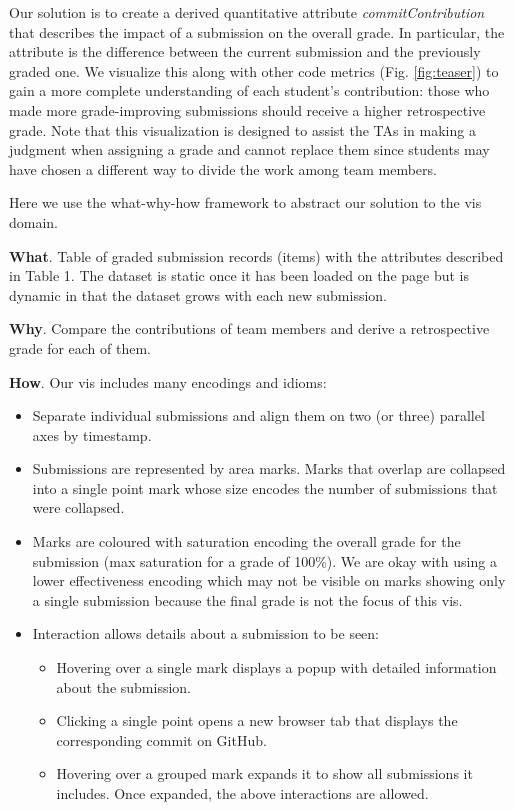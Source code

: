 \documentclass[../manifest.tex]{subfiles}
\begin{document}
Our solution is to create a derived quantitative attribute \textit{commitContribution} that describes
the impact of a submission on the overall grade. In particular, the attribute is
the difference between the current submission and the previously graded one. We
visualize this along with other code metrics (Fig. \ref{fig:teaser}) to gain a more
complete understanding of each student's contribution: those who made more grade-improving
submissions should receive a higher retrospective grade. Note that this visualization
is designed to assist the TAs in
making a judgment when assigning a grade and cannot replace them since students may
have chosen a different way to divide the work among team members.

Here we use the what-why-how framework \cite{Munzner:2014} to abstract our solution to the vis domain.

\textbf{What}. Table of graded submission records (items) with the attributes
described in Table 1. The dataset is static once it has been loaded on the page
but is dynamic in that the dataset grows with each new submission.

\textbf{Why}. Compare the contributions of team members and derive a retrospective
grade for each of them.

\textbf{How}. Our vis includes many encodings and idioms:
\begin{itemize}
  \item Separate individual submissions and align them on two (or three)
        parallel axes by timestamp.
  \item Submissions are represented by area marks. Marks that overlap are collapsed into
    a single point mark whose size encodes the number of submissions that were collapsed.
  \item Marks are coloured with saturation encoding the overall grade for the submission (max saturation for a grade of 100\%).
    We are okay with using a lower effectiveness encoding which may not be visible on marks showing only a single submission
    because the final grade is not the focus of this vis.
  \item Interaction allows details about a submission to be seen:
    \begin{itemize}
      \item Hovering over a single mark displays a popup with detailed information about the submission.
      \item Clicking a single point opens a new browser tab that displays the corresponding commit on GitHub.
      \item Hovering over a grouped mark expands it to show all submissions it includes. Once expanded,
        the above interactions are allowed.
    \end{itemize}
\end{itemize}
\end{document}
